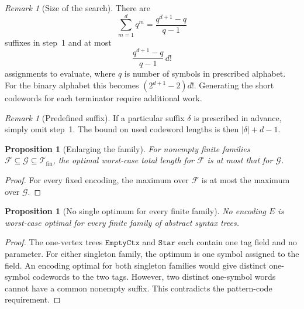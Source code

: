 \documentclass{article}%
\newtheorem{proposition}[theorem]{Proposition}
\theoremstyle{remark}
\newtheorem{remark}[theorem]{Remark}
\theoremstyle{definition}
\theoremstyle{definition}
\theoremstyle{plain}
\begin{document}
\begin{remark}[Size of the search]
There are
\[
  \sum_{m=1}^{d}q^m=\frac{q^{d+1}-q}{q-1}
\]
suffixes in step~1 and at most
\[
  \frac{q^{d+1}-q}{q-1}\,d!
\]
assignments to evaluate, where \(q\) is number of symbols in prescribed
alphabet. For the binary alphabet this becomes \((2^{d+1}-2)d!\). Generating the
short codewords for each terminator require additional work.
\end{remark}


\begin{remark}[Predefined suffix]
If a particular suffix \(\delta\) is prescribed in advance, simply omit step~1.
The bound on used codeword lengths is then \(|\delta|+d-1\).
\end{remark}

\begin{proposition}[Enlarging the family]
\label{prop:minimax-family-monotonicity}
For nonempty finite families \(\mathcal F\subseteq\mathcal
G\subseteq\mathcal{T}_\text{fin}\), the optimal worst-case total length for \(\mathcal F\)
is at most that for \(\mathcal G\).
\end{proposition}
\begin{proof}
For every fixed encoding, the maximum over \(\mathcal F\) is at most the maximum
over \(\mathcal G\).
\end{proof}

\begin{proposition}[No single optimum for every finite family]
\label{prop:no-uniform-pattern-optimum}
No encoding \(E\) is worst-case optimal for every finite family of \catt
abstract syntax trees.
\end{proposition}
\begin{proof}
The one-vertex trees \(\texttt{EmptyCtx}\) and \(\texttt{Star}\) each contain
one tag field and no parameter. For either singleton family, the optimum is one
symbol assigned to the field. An encoding optimal for both singleton families
would give distinct one-symbol codewords to the two tags. However, two distinct
one-symbol words cannot have a common nonempty suffix. This contradicts the
pattern-code requirement.
\end{proof}
\end{document}
